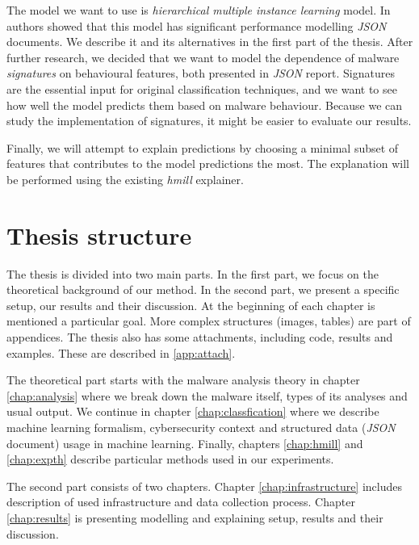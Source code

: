 The model we want to use is \emph{hierarchical multiple instance learning} model. In \cite{Mandlik2020} authors showed that this model has significant performance modelling \emph{JSON} documents. We describe it and its alternatives in the first part of the thesis. After further research, we decided that we want to model the dependence of malware \emph{signatures} on behavioural features, both presented in \emph{JSON} report. Signatures are the essential input for original classification techniques, and we want to see how well the model predicts them based on malware behaviour. Because we can study the implementation of signatures, it might be easier to evaluate our results.

Finally, we will attempt to explain predictions by choosing a minimal subset of features that contributes to the model predictions the most. 
The explanation will be performed using the existing \emph{hmill} explainer.

\section{Thesis structure}
The thesis is divided into two main parts. In the first part, we focus on the theoretical background of our method. In the second part, we present a specific setup, our results and their discussion. At the beginning of each chapter is mentioned a particular goal. More complex structures (images, tables) are part of appendices. The thesis also has some attachments, including code, results and examples. These are described in \ref{app:attach}.

The theoretical part starts with the malware analysis theory in chapter \ref{chap:analysis} where we break down the malware itself, types of its analyses and usual output. We continue in chapter \ref{chap:classfication} where we describe machine learning formalism, cybersecurity context and structured data (\emph{JSON} document) usage in machine learning. Finally, chapters \ref{chap:hmill} and \ref{chap:expth} describe particular methods used in our experiments.

The second part consists of two chapters. Chapter \ref{chap:infrastructure} includes description of used infrastructure and data collection process. Chapter \ref{chap:results} is presenting modelling and explaining setup, results and their discussion.






